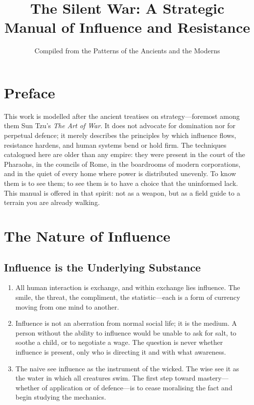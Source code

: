 \documentclass[12pt,a4paper,oneside]{book}
\title{The Silent War: A Strategic Manual of Influence and Resistance}
\author{Compiled from the Patterns of the Ancients and the Moderns}
\date{}
\begin{document}
\frontmatter
\maketitle
\tableofcontents

\mainmatter

\chapter*{Preface}

This work is modelled after the ancient treatises on strategy—foremost among them Sun Tzu's \textit{The Art of War}. It does not advocate for domination nor for perpetual defence; it merely describes the principles by which influence flows, resistance hardens, and human systems bend or hold firm. The techniques catalogued here are older than any empire: they were present in the court of the Pharaohs, in the councils of Rome, in the boardrooms of modern corporations, and in the quiet of every home where power is distributed unevenly. To know them is to see them; to see them is to have a choice that the uninformed lack. This manual is offered in that spirit: not as a weapon, but as a field guide to a terrain you are already walking.

\chapter{The Nature of Influence}
\section{Influence is the Underlying Substance}
\begin{enumerate}[leftmargin=*, label=\arabic*.]
\item All human interaction is exchange, and within exchange lies influence. The smile, the threat, the compliment, the statistic—each is a form of currency moving from one mind to another.
\item Influence is not an aberration from normal social life; it is the medium. A person without the ability to influence would be unable to ask for salt, to soothe a child, or to negotiate a wage. The question is never whether influence is present, only who is directing it and with what awareness.
\item The naive see influence as the instrument of the wicked. The wise see it as the water in which all creatures swim. The first step toward mastery—whether of application or of defence—is to cease moralising the fact and begin studying the mechanics.
\end{enumerate}
\end{document}
